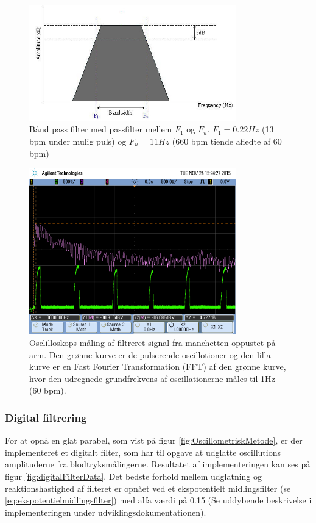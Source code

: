 \begin{figure}[H]
	\centering
	\includegraphics[trim={0 0 0 1.5cm},clip, width=0.8\textwidth]{billeder/BandPass_filter.JPG}
	\caption{Bånd pass filter med passfilter mellem $F_1$ og $F_u$. $F_1=0.22Hz$ (13 bpm under mulig puls) og $F_u=11Hz$ (660 bpm tiende afledte af 60 bpm) }\label{fig:BandPassFilter}
\end{figure}

\begin{figure}[H]
	\centering
	\includegraphics[trim={0 2.5cm 0 1.5cm},clip, width=0.8\textwidth]{billeder/filteredPulseSignalWithFFT.png}
	\caption{Osclilloskops måling af filtreret signal fra manchetten oppustet på arm. Den grønne kurve er de pulserende oscillotioner og den lilla kurve er en Fast Fourier Transformation (FFT) af den grønne kurve, hvor den udregnede grundfrekvens af oscillationerne måles til 1Hz (60 bpm).}\label{fig:filteredPulseSignalWithFFT}
\end{figure}

\subsubsection{Digital filtrering}
For at opnå en glat parabel, som vist på  figur \ref{fig:OscillometriskMetode}, er der implementeret et digitalt filter, som har til opgave at udglatte oscillutions amplituderne fra blodtryksmålingerne. Resultatet af implementeringen kan ses på figur \ref{fig:digitalFilterData}. Det bedste forhold mellem udglatning og reaktionshastighed af filteret er opnået ved et ekspotentielt midlingsfilter (se \ref{eq:ekspotentielmidlingsfilter}) med alfa værdi på 0.15 (Se uddybende beskrivelse i implementeringen under udviklingsdokumentationen).  

